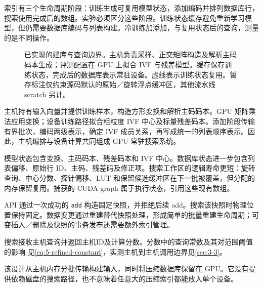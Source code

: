 索引有三个生命周期阶段：训练生成可复用模型状态，添加编码并排列数据库行，搜索使用完成后的数组。实验必须区分这些阶段。训练状态缓存避免重新学习模型，但仍需要数据库编码与列表构建。冷训练加添加，与复用状态后的查询，测量的是不同操作。

\begin{figure}[tbp]
\centering

\caption[构建与查询架构]{已实现的建库与查询边界。主机负责采样、正交矩阵构造及解析主码码本生成；评测配置在 GPU 上拟合 IVF 与残差模型。缓存保存训练状态，完成后的数据库表示常驻设备。虚线表示训练状态复用。暂存标注仅约束源码默认的原始／旋转浮点缓冲区，其他流水线 scratch 另计。}
\label{fig:4-architecture}
\end{figure}

主机持有输入向量并提供训练样本，构造方形变换和解析主码码本。GPU 矩阵乘法应用变换；设备训练路径拟合粗粒度 IVF 中心及标量残差码本。添加阶段传输有界批次，编码两级表示，确定 IVF 成员关系，再写成统一的列表顺序表示。因此，主机编排与设备计算共同组成 GPU 常驻搜索系统。

模型状态包含变换、主码码本、残差码本和 IVF 中心。数据库状态进一步包含列表偏移、原始行 ID、主码、残差码及修正项。搜索工作区的逻辑寿命更短：旋转查询、中心分数、探针偏移、LUT 和保留候选缓冲区在下一批被覆盖，但分配的内存保留复用。捕获的 CUDA graph 属于执行状态，引用这些现有数组。

API 通过一次成功的 \texttt{add} 构造固定快照，并拒绝后续 add。搜索该快照时物理位置保持固定。数据变更通过重建替代快照处理，形成简单的批量重建生命周期；可变插入／删除及快照的事务发布还需要额外索引管理。

搜索接收主机查询并返回主机ID及计算分数。分数中的查询常数及其对范围阈值的影响
见\cref{eq:5-refined-constant}，实测主机到主机调用边界见\cref{sec:3-3}。


该设计从主机内存分批传输构建输入，同时将压缩数据库保留在 GPU。它没有提供依赖磁盘的搜索路径，也不意味着任意大的压缩索引都能放入单个设备。
